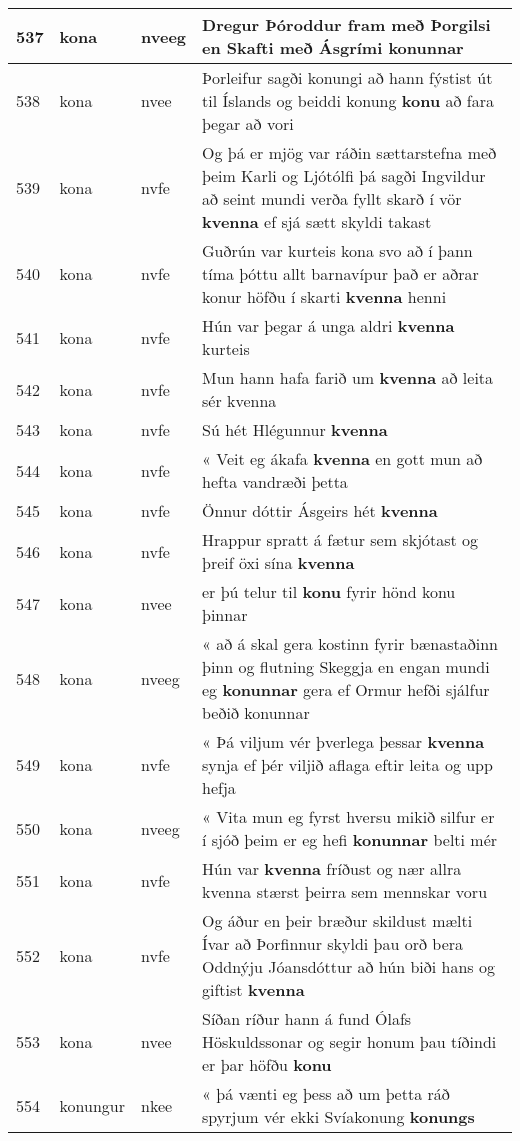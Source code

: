 \documentclass{article}
\begin{document}
\begin{longtable}{p{1cm}|p{1cm}|p{1cm}|p{13cm}}
\hline
537&kona&nveeg&Dregur Þóroddur fram með Þorgilsi en Skafti með Ásgrími \textbf{konunnar} \\
\hline
538&kona&nvee&Þorleifur sagði konungi að hann fýstist út til Íslands og beiddi konung \textbf{konu} að fara þegar að vori\\
\hline
539&kona&nvfe&Og þá er mjög var ráðin sættarstefna með þeim Karli og Ljótólfi þá sagði Ingvildur að seint mundi verða fyllt skarð í vör \textbf{kvenna} ef sjá sætt skyldi takast\\
\hline
540&kona&nvfe&Guðrún var kurteis kona svo að í þann tíma þóttu allt barnavípur það er aðrar konur höfðu í skarti \textbf{kvenna} henni\\
\hline
541&kona&nvfe&Hún var þegar á unga aldri \textbf{kvenna} kurteis\\
\hline
542&kona&nvfe&Mun hann hafa farið um \textbf{kvenna} að leita sér kvenna\\
\hline
543&kona&nvfe&Sú hét Hlégunnur \textbf{kvenna} \\
\hline
544&kona&nvfe&« Veit eg ákafa \textbf{kvenna} en gott mun að hefta vandræði þetta\\
\hline
545&kona&nvfe&Önnur dóttir Ásgeirs hét \textbf{kvenna} \\
\hline
546&kona&nvfe&Hrappur spratt á fætur sem skjótast og þreif öxi sína \textbf{kvenna} \\
\hline
547&kona&nvee&er þú telur til \textbf{konu} fyrir hönd konu þinnar\\
\hline
548&kona&nveeg&« að á skal gera kostinn fyrir bænastaðinn þinn og flutning Skeggja en engan mundi eg \textbf{konunnar} gera ef Ormur hefði sjálfur beðið konunnar\\
\hline
549&kona&nvfe&« Þá viljum vér þverlega þessar \textbf{kvenna} synja ef þér viljið aflaga eftir leita og upp hefja\\
\hline
550&kona&nveeg&« Vita mun eg fyrst hversu mikið silfur er í sjóð þeim er eg hefi \textbf{konunnar} belti mér\\
\hline
551&kona&nvfe&Hún var \textbf{kvenna} fríðust og nær allra kvenna stærst þeirra sem mennskar voru\\
\hline
552&kona&nvfe&Og áður en þeir bræður skildust mælti Ívar að Þorfinnur skyldi þau orð bera Oddnýju Jóansdóttur að hún biði hans og giftist \textbf{kvenna} \\
\hline
553&kona&nvee&Síðan ríður hann á fund Ólafs Höskuldssonar og segir honum þau tíðindi er þar höfðu \textbf{konu} \\
\hline
554&konungur&nkee&« þá vænti eg þess að um þetta ráð spyrjum vér ekki Svíakonung \textbf{konungs} \\

\end{longtable}
\end{document}

